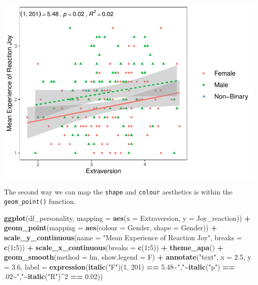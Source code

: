 \documentclass[
]{book}
\newenvironment{Shaded}{\begin{snugshade}}{\end{snugshade}}
\newcommand{\AttributeTok}[1]{\textcolor[rgb]{0.13,0.29,0.53}{#1}}
\newcommand{\DecValTok}[1]{\textcolor[rgb]{0.00,0.00,0.81}{#1}}
\newcommand{\FloatTok}[1]{\textcolor[rgb]{0.00,0.00,0.81}{#1}}
\newcommand{\FunctionTok}[1]{\textcolor[rgb]{0.13,0.29,0.53}{\textbf{#1}}}
\newcommand{\NormalTok}[1]{#1}
\newcommand{\SpecialCharTok}[1]{\textcolor[rgb]{0.81,0.36,0.00}{\textbf{#1}}}
\newcommand{\StringTok}[1]{\textcolor[rgb]{0.31,0.60,0.02}{#1}}
\begin{document}
\includegraphics{rintro_demo_files/figure-latex/unnamed-chunk-316-1.pdf}

The second way we can map the \texttt{shape} and \texttt{colour} aesthetics is within the \texttt{geom\_point()} function.

\begin{Shaded}
\begin{Highlighting}[]
\FunctionTok{ggplot}\NormalTok{(df\_personality, }\AttributeTok{mapping =} \FunctionTok{aes}\NormalTok{(}\AttributeTok{x =}\NormalTok{ Extraversion, }\AttributeTok{y =}\NormalTok{ Joy\_reaction)) }\SpecialCharTok{+}
  \FunctionTok{geom\_point}\NormalTok{(}\AttributeTok{mapping =} \FunctionTok{aes}\NormalTok{(}\AttributeTok{colour =}\NormalTok{ Gender, }\AttributeTok{shape =}\NormalTok{ Gender)) }\SpecialCharTok{+}
  \FunctionTok{scale\_y\_continuous}\NormalTok{(}\AttributeTok{name =} \StringTok{"Mean Experience of Reaction Joy"}\NormalTok{, }\AttributeTok{breaks =} \FunctionTok{c}\NormalTok{(}\DecValTok{1}\SpecialCharTok{:}\DecValTok{5}\NormalTok{)) }\SpecialCharTok{+}
  \FunctionTok{scale\_x\_continuous}\NormalTok{(}\AttributeTok{breaks =} \FunctionTok{c}\NormalTok{(}\DecValTok{1}\SpecialCharTok{:}\DecValTok{5}\NormalTok{)) }\SpecialCharTok{+}
  \FunctionTok{theme\_apa}\NormalTok{() }\SpecialCharTok{+}
  \FunctionTok{geom\_smooth}\NormalTok{(}\AttributeTok{method =}\NormalTok{ lm, }\AttributeTok{show.legend =}\NormalTok{ F) }\SpecialCharTok{+}
  \FunctionTok{annotate}\NormalTok{(}\StringTok{"text"}\NormalTok{, }\AttributeTok{x =} \FloatTok{2.5}\NormalTok{, }\AttributeTok{y =} \FloatTok{3.6}\NormalTok{,}
           \AttributeTok{label =} \FunctionTok{expression}\NormalTok{(}\FunctionTok{italic}\NormalTok{(}\StringTok{"F"}\NormalTok{)(}\DecValTok{1}\NormalTok{, }\DecValTok{201}\NormalTok{) }\SpecialCharTok{==} \FloatTok{5.48}\SpecialCharTok{\textasciitilde{}}\StringTok{","}\SpecialCharTok{\textasciitilde{}}\FunctionTok{italic}\NormalTok{(}\StringTok{"p"}\NormalTok{) }\SpecialCharTok{==}\NormalTok{ .}\DecValTok{02}\SpecialCharTok{\textasciitilde{}}\StringTok{","}\SpecialCharTok{\textasciitilde{}}\FunctionTok{italic}\NormalTok{(}\StringTok{"R"}\NormalTok{)}\SpecialCharTok{\^{}}\DecValTok{2} \SpecialCharTok{==} \FloatTok{0.02}\NormalTok{))}
\end{Highlighting}
\end{Shaded}
\end{document}
